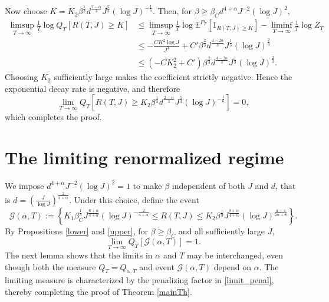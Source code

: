 \documentclass[12pt]{amsart}
\numberwithin{equation}{section}
\newcommand{\E}{\mathbb{E}}
\newcommand{\1}{\mathbf{1}}
\begin{document}
Now choose $K = K_2\beta^{\frac{1}{3}}d^{\frac{2-\alpha}{3}}J^{\frac{5}{3}}(\log J)^{-\frac{1}{6}}$. Then, for $\beta \geq\beta_Cd^{4+\alpha}J^{-2}(\log J)^{2}$,
\begin{equation*}
\begin{split}
    \limsup_{T\to \infty}\frac{1}{T}\log Q_T\left[R(T,J)\geq K\right]&\leq\limsup_{T\to \infty}\frac{1}{T}\log \E^{P_T}\left[1_{R(T,J)\geq K}\right]-\liminf_{T\to\infty}\frac{1}{T}\log Z_T\\
    &\leq -\frac{CK^2\log J}{J^3}+C'\beta^{\frac{2}{3}}d^{\frac{4-2\alpha}{3}}J^{\frac{1}{3}}(\log J)^{\frac{2}{3}}\\
    &\leq (-CK_2^2+C')\beta^{\frac{2}{3}}d^{\frac{4-2\alpha}{3}}J^{\frac{1}{3}}(\log J)^{\frac{2}{3}}.
    \end{split}
\end{equation*}
Choosing $K_2$ sufficiently large makes the coefficient strictly negative. Hence the exponential decay rate is negative, and therefore
\begin{equation*}
\lim_{T\to\infty}Q_T\left[R(T,J)\geq K_2\beta^{\frac{1}{3}}d^{\frac{2-\alpha}{3}}J^{\frac{5}{3}}(\log J)^{-\frac{1}{6}}\right] = 0,
\end{equation*}
which completes the proof. 

\section{The limiting renormalized regime}
\label{limitalpha}
We impose $d^{4+\alpha}J^{-2}(\log J)^2=1$ to make $\beta$ independent of both $J$ and $d$, that is $d=\left(\frac{J}{\log J}\right)^{\frac{2}{4+\alpha}}$. Under this choice, define the event 
\begin{equation*}
    \mathcal{G}(\alpha,T):=\left\lbrace K_1\beta_C^{\frac{1}{3}}J^{\frac{6+\alpha}{4+\alpha}}(\log J)^{-\frac{2}{4+\alpha}}\leq R(T,J)\leq K_2\beta^{\frac{1}{3}}J^{\frac{8+\alpha}{4+\alpha}}(\log J)^{\frac{\alpha-4}{2\alpha+8}}\right\rbrace.
\end{equation*} 
By Propositions \ref{lower} and \ref{upper}, for $\beta\ge \beta_C$ and all sufficiently large $J$,
\begin{equation*}
    \lim_{T\to\infty}Q_T[\mathcal{G}(\alpha,T)]=1.
\end{equation*}
The next lemma shows that the limits in $\alpha$ and $T$ may be interchanged, even though both the measure $Q_{T}=Q_{\alpha,T}$ and event $\mathcal{G}(\alpha, T)$ depend on $\alpha$. The limiting measure is characterized by the penalizing factor in \eqref{limit_penal}, thereby completing the proof of Theorem \ref{mainTh}.
\end{document}
